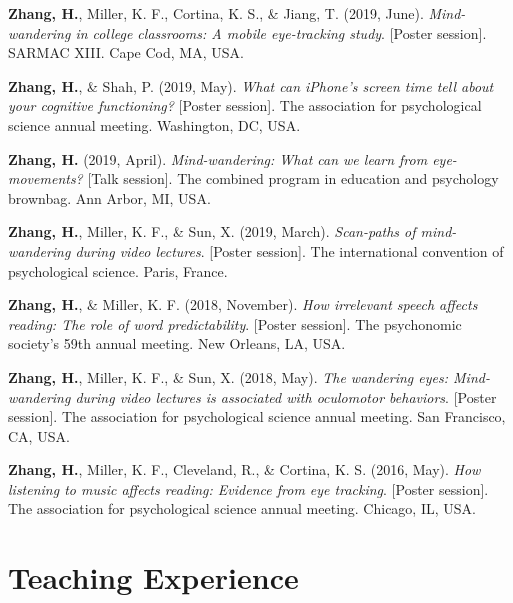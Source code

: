 \documentclass[11pt,a4paper,]{awesome-cv}
\begin{document}
\leavevmode{}%
\textbf{Zhang, H.}, Miller, K. F., Cortina, K. S., \& Jiang, T. (2019,
June). \emph{Mind-wandering in college classrooms: A mobile eye-tracking
study}. {[}Poster session{]}. SARMAC XIII. Cape Cod, MA, USA.

\leavevmode{}%
\textbf{Zhang, H.}, \& Shah, P. (2019, May). \emph{What can iPhone's
screen time tell about your cognitive functioning?} {[}Poster
session{]}. The association for psychological science annual meeting.
Washington, DC, USA.

\leavevmode{}%
\textbf{Zhang, H.} (2019, April). \emph{Mind-wandering: What can we
learn from eye-movements?} {[}Talk session{]}. The combined program in
education and psychology brownbag. Ann Arbor, MI, USA.

\leavevmode{}%
\textbf{Zhang, H.}, Miller, K. F., \& Sun, X. (2019, March).
\emph{Scan-paths of mind-wandering during video lectures}. {[}Poster
session{]}. The international convention of psychological science.
Paris, France.

\leavevmode{}%
\textbf{Zhang, H.}, \& Miller, K. F. (2018, November). \emph{How
irrelevant speech affects reading: The role of word predictability}.
{[}Poster session{]}. The psychonomic society's 59th annual meeting. New
Orleans, LA, USA.

\leavevmode{}%
\textbf{Zhang, H.}, Miller, K. F., \& Sun, X. (2018, May). \emph{The
wandering eyes: Mind-wandering during video lectures is associated with
oculomotor behaviors}. {[}Poster session{]}. The association for
psychological science annual meeting. San Francisco, CA, USA.

\leavevmode{}%
\textbf{Zhang, H.}, Miller, K. F., Cleveland, R., \& Cortina, K. S.
(2016, May). \emph{How listening to music affects reading: Evidence from
eye tracking}. {[}Poster session{]}. The association for psychological
science annual meeting. Chicago, IL, USA.

\hypertarget{teaching-experience}{%
\section{Teaching Experience}\label{teaching-experience}}
\end{document}
